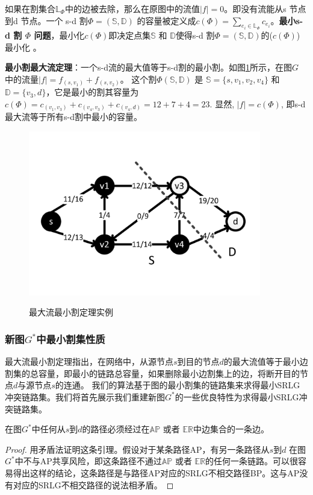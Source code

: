 如果在割集合$\mathbb{\mathbb{L}}_{\Phi}$中的边被去除，那么在原图中的流值$|f| = 0$。即没有流能从s 节点到d 节点。一个 s-d 割${\Phi}=(\mathbb{S},\mathbb{D})$ 的容量被定义成$c(\Phi)=\sum\limits_{e_i\in \mathbb{\mathbb{L}}_{\Phi}}c_{e_i}$。\textbf{最小s-d 割 $\Phi$ 问题}，最小化$c(\Phi)$即决定点集$\mathbb{S}$ 和 $\mathbb{D}$使得s-d 割${\Phi}=(\mathbb{S},\mathbb{D})$的($c(\Phi)$) 最小化 。

\textbf{最小割最大流定理}：一个s-d流的最大值等于s-d割的最小割。如图\ref{fig:FlowNetwork}所示，在图$G$ 中的流量$|f|=f_{(s,v_1)}+f_{(s,v_2)}$。 这个割$\Phi(\mathbb{S},\mathbb{D})$ 是 $\mathbb{S}=\{s,v_1,v_2,v_4\}$ 和$\mathbb{D}=\{v_3,d\}$，它是最小的割其容量为$c(\Phi)=c_{(v_1,v_3)}+c_{(v_4,v_3)}+c_{(v_4,d)}=12+7+4=23$. 显然, $|f|=c(\Phi)$, 即s-d 最大流等于所有s-d割中最小的容量。
\begin{figure}[htbp]
  \centering
  \includegraphics[width=4.0in]{figures/FlowNetwork}\\
  \caption{最大流最小割定理实例}
  \label{fig:FlowNetwork}
\end{figure}

\subsubsection{新图$G^*$中最小割集性质}
最大流最小割定理指出，在网络中，从源节点$s$到目的节点$d$的最大流值等于最小边割集的总容量，即最小的链路总容量，如果删除最小边割集上的边，将断开目的节点$d$与源节点$s$的连通。 我们的算法基于图的最小割集的链路集来求得最小SRLG 冲突链路集。我们将首先展示我们重建新图$G^*$的一些优良特性为求得最小SRLG冲突链路集。

\begin{lemma}
\label{le:lemma1}
    在图$G^*$中任何从$s$到$d$的路径必须经过在$\mathbb{AP}$ 或者 $\mathbb{\mathbb{ER}}$中边集合的一条边。
\end{lemma}
\begin{proof}
用矛盾法证明这条引理。假设对于某条路径AP，有另一条路径从$s$到$d$ 在图$G^*$中不与AP共享风险，即这条路径不通过$\mathbb{AP}$ 或者 $\mathbb{\mathbb{ER}}$的任何一条链路。可以很容易得出这样的结论，这条路径是与路径AP对应的SRLG不相交路径BP。这与AP没有对应的SRLG不相交路径的说法相矛盾。
\end{proof}

